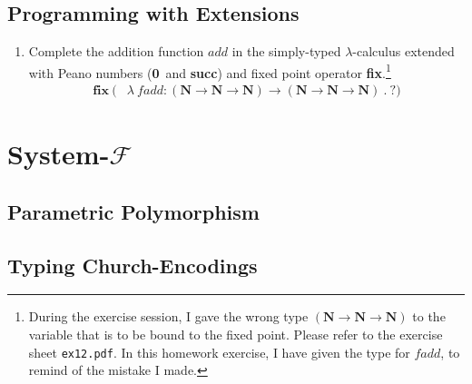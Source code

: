 \documentclass[a4paper,12pt]{article}
\newcommand{\NatT}{\textbf{N}}
\newcommand{\rarr}{\rightarrow}
\newcommand{\lamb}{\lambda}
\newcommand{\zero}{\textbf{0}}
\renewcommand{\succ}{\textbf{succ}}
\newcommand{\fixp}{\textbf{fix}}
\begin{document}
\subsection{Programming with Extensions}

\begin{enumerate}
 \item Complete the addition function $add$ in the simply-typed $\lamb$-calculus extended with Peano numbers
  (\zero\ and \succ) and fixed point operator \fixp.\footnote{During the exercise session, I gave the wrong
  type $(\NatT \rarr \NatT \rarr \NatT)$ to the variable that is to be bound to the fixed point.  Please
  refer to the exercise sheet \texttt{ex12.pdf}.  In this homework exercise, I have given the type for
  $fadd$, to remind of the mistake I made.}
  \begin{align*}
   \fixp\ (& \lamb\ fadd : (\NatT \rarr \NatT \rarr \NatT) \rarr (\NatT \rarr \NatT \rarr \NatT)\ .\ ?)
  \end{align*}
\end{enumerate}

\section{System-$\mathcal{F}$}

\subsection{Parametric Polymorphism}

\subsection{Typing Church-Encodings}
\end{document}
